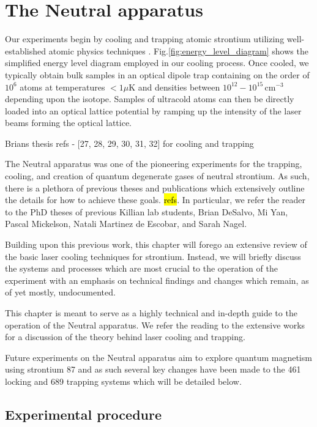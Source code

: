 \chapter{The Neutral apparatus}
\label{ch:chap2}

Our experiments begin by cooling and trapping atomic strontium utilizing well-established atomic physics techniques \cite{Metcalf1999,Katori1999,Ido2000,Nagel2003,Mukaiyama2003a,Loftus2004,DeEscobar2009a,Stellmer2009,Stellmer2010,Mickelson2010,DeSalvo2010,Tey2010a}. Fig.\;\ref{fig:energy_level_diagram} shows the simplified energy level diagram employed in our cooling process. Once cooled, we typically obtain bulk samples in an optical dipole trap containing on the order of $10^6$ atoms at temperatures $<1\mu$K and densities between $10^{12} - 10^{15}\,$cm$^{-3}$ depending upon the isotope. Samples of ultracold atoms can then be directly loaded into an optical lattice potential by ramping up the intensity of the laser beams forming the optical lattice.


Brians thesis
refs - [27, 28, 29, 30, 31, 32] for cooling and trapping

The Neutral apparatus was one of the pioneering experiments for the trapping, cooling, and creation of quantum degenerate gases of neutral strontium. As such, there is a plethora of previous theses and publications which extensively outline the details for how to achieve these goals. \hl{refs}. In particular, we refer the reader to the PhD theses of previous Killian lab students, Brian DeSalvo, Mi Yan, Pascal Mickelson, Natali Martinez de Escobar, and Sarah Nagel.

Building upon this previous work, this chapter will forego an extensive review of the basic laser cooling techniques for strontium. Instead, we will briefly discuss the systems and processes which are most crucial to the operation of the experiment with an emphasis on technical findings and changes which remain, as of yet mostly, undocumented.

This chapter is meant to serve as a highly technical and in-depth guide to the operation of the Neutral apparatus. We refer the reading to the extensive works for a discussion of the theory behind laser cooling and trapping.

Future experiments on the Neutral apparatus aim to explore quantum magnetism using strontium 87 and as such several key changes have been made to the 461 locking and 689 trapping systems which will be detailed below. 

\section{Experimental procedure} \label{sec:trapping}

